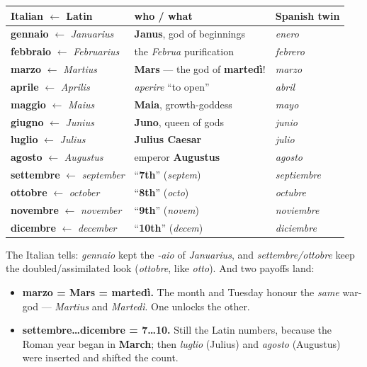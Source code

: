 \begin{cousinweb}
\noindent
\begin{tabularx}{\linewidth}{@{}>{\raggedright\arraybackslash}X>{\raggedright\arraybackslash}X>{\raggedright\arraybackslash}X@{}}
\toprule
\textbf{Italian $\leftarrow$ Latin} & \textbf{who / what} & \textbf{Spanish twin} \\
\midrule
\textbf{gennaio} $\leftarrow$ \emph{Januarius} & \textbf{Janus}, god of beginnings & \emph{enero} \\
\textbf{febbraio} $\leftarrow$ \emph{Februarius} & the \emph{Februa} purification & \emph{febrero} \\
\textbf{marzo} $\leftarrow$ \emph{Martius} & \textbf{Mars} — the god of \textbf{martedì}! & \emph{marzo} \\
\textbf{aprile} $\leftarrow$ \emph{Aprilis} & \emph{aperire} \textquotedblleft{}to open\textquotedblright{} & \emph{abril} \\
\textbf{maggio} $\leftarrow$ \emph{Maius} & \textbf{Maia}, growth-goddess & \emph{mayo} \\
\textbf{giugno} $\leftarrow$ \emph{Junius} & \textbf{Juno}, queen of gods & \emph{junio} \\
\textbf{luglio} $\leftarrow$ \emph{Julius} & \textbf{Julius Caesar} & \emph{julio} \\
\textbf{agosto} $\leftarrow$ \emph{Augustus} & emperor \textbf{Augustus} & \emph{agosto} \\
\textbf{settembre} $\leftarrow$ \emph{september} & \textquotedblleft{}\textbf{7th}\textquotedblright{} (\emph{septem}) & \emph{septiembre} \\
\textbf{ottobre} $\leftarrow$ \emph{october} & \textquotedblleft{}\textbf{8th}\textquotedblright{} (\emph{octo}) & \emph{octubre} \\
\textbf{novembre} $\leftarrow$ \emph{november} & \textquotedblleft{}\textbf{9th}\textquotedblright{} (\emph{novem}) & \emph{noviembre} \\
\textbf{dicembre} $\leftarrow$ \emph{december} & \textquotedblleft{}\textbf{10th}\textquotedblright{} (\emph{decem}) & \emph{diciembre} \\
\bottomrule
\end{tabularx}

The Italian tells: \emph{gennaio} kept the \emph{-aio} of \emph{Januarius}, and \emph{settembre/ottobre} keep the doubled/assimilated look (\emph{ottobre}, like \emph{otto}). And two payoffs land:

\begin{itemize}
\raggedright
  \item \textbf{marzo = Mars = martedì.} The month and Tuesday honour the \emph{same} war-god — \emph{Martius} and \emph{Martedì}. One unlocks the other.
  \item \textbf{settembre…dicembre = 7…10.} Still the Latin numbers, because the Roman year began in \textbf{March}; then \emph{luglio} (Julius) and \emph{agosto} (Augustus) were inserted and shifted the count.
\end{itemize}
\end{cousinweb}


